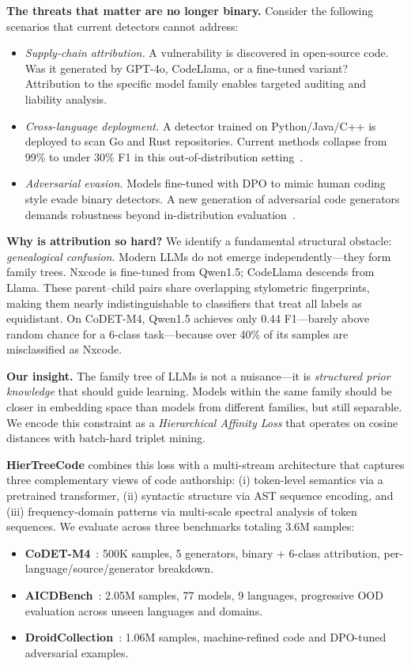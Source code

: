 \documentclass{article}
\begin{document}
\textbf{The threats that matter are no longer binary.} Consider the following scenarios that current detectors cannot address:
\begin{itemize}[leftmargin=*,itemsep=2pt]
\item \emph{Supply-chain attribution.} A vulnerability is discovered in open-source code. Was it generated by GPT-4o, CodeLlama, or a fine-tuned variant? Attribution to the specific model family enables targeted auditing and liability analysis.
\item \emph{Cross-language deployment.} A detector trained on Python/Java/C++ is deployed to scan Go and Rust repositories. Current methods collapse from 99\% to under 30\% F1 in this out-of-distribution setting~\citep{aicd2025}.
\item \emph{Adversarial evasion.} Models fine-tuned with DPO to mimic human coding style evade binary detectors. A new generation of adversarial code generators demands robustness beyond in-distribution evaluation~\citep{droid2025}.
\end{itemize}

\textbf{Why is attribution so hard?} We identify a fundamental structural obstacle: \emph{genealogical confusion}. Modern LLMs do not emerge independently---they form family trees. Nxcode is fine-tuned from Qwen1.5; CodeLlama descends from Llama. These parent--child pairs share overlapping stylometric fingerprints, making them nearly indistinguishable to classifiers that treat all labels as equidistant. On CoDET-M4, Qwen1.5 achieves only 0.44 F1---barely above random chance for a 6-class task---because over 40\% of its samples are misclassified as Nxcode.

\textbf{Our insight.} The family tree of LLMs is not a nuisance---it is \emph{structured prior knowledge} that should guide learning. Models within the same family should be closer in embedding space than models from different families, but still separable. We encode this constraint as a \emph{Hierarchical Affinity Loss} that operates on cosine distances with batch-hard triplet mining.

\textbf{HierTreeCode} combines this loss with a multi-stream architecture that captures three complementary views of code authorship: (i) token-level semantics via a pretrained transformer, (ii) syntactic structure via AST sequence encoding, and (iii) frequency-domain patterns via multi-scale spectral analysis of token sequences. We evaluate across three benchmarks totaling 3.6M samples:

\begin{itemize}[leftmargin=*,itemsep=2pt]
\item \textbf{CoDET-M4}~\citep{orel2025codet}: 500K samples, 5 generators, binary + 6-class attribution, per-language/source/generator breakdown.
\item \textbf{AICDBench}~\citep{aicd2025}: 2.05M samples, 77 models, 9 languages, progressive OOD evaluation across unseen languages and domains.
\item \textbf{DroidCollection}~\citep{droid2025}: 1.06M samples, machine-refined code and DPO-tuned adversarial examples.
\end{itemize}
\end{document}
